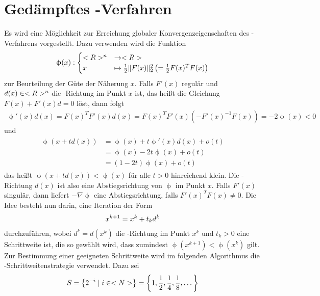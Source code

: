 \section{Gedämpftes -Verfahren}

Es wird eine Möglichkeit zur Erreichung globaler Konvergenzeigenschaften des -Verfahrens vorgestellt. Dazu verwenden wird die Funktion
\begin{align}
	\upphi(x): \begin{cases}
		<R>^n&\to <R> \\
		x&\mapsto \frac{1}{2}\Vert F(x)\Vert_2^2 \left(=\frac{1}{2}F(x)^TF(x)\right)
	\end{cases}\notag
\end{align}
zur Beurteilung der Güte der Näherung $x$. Falls $F'(x)$ regulär und $d(x)\in<R>^n$ die -Richtung im Punkt $x$ ist, das heißt die Gleichung $F(x)+F'(x)d=0$ löst, dann folgt
\begin{align}
	\label{5.6}
	\upphi'(x)d(x) = F(x)^TF'(x)d(x) = F(x)^TF'(x)\left(-F'(x)^{-1}F(x)\right) = -2\upphi(x)< 0
\end{align}
und
\begin{align}
	\label{5.7}
	\begin{split}
		\upphi(x+td(x)) &= \upphi(x) + t\upphi'(x)d(x)+o(t) \\
		&= \upphi(x) - 2t\upphi(x) + o(t) \\
		&= (1-2t)\upphi(x) + o(t)
	\end{split}
\end{align}
das heißt $\upphi(x+td(x))<\upphi(x)$ für alle $t>0$ hinreichend klein. Die -Richtung $d(x)$ ist also eine Abstiegsrichtung von $\upphi$ im Punkt $x$. Falls $F'(x)$ singulär, dann liefert $-\nabla\upphi$ eine Abstiegsrichtung, falls $F'(x)^TF(x)\neq 0$. Die Idee besteht nun darin, eine Iteration der Form
\begin{align}
	x^{k+1} = x^k + t_kd^k\notag
\end{align}
durchzuführen, wobei $d^k=d(x^k)$ die -Richtung im Punkt $x^k$ und $t_k>0$ eine Schrittweite ist, die so gewählt wird, dass zumindest $\upphi(x^{k+1})<\upphi(x^k)$ gilt. Zur Bestimmung einer geeigneten Schrittweite wird im folgenden Algorithmus die -Schrittweitenstrategie verwendet. Dazu sei
\begin{align}
	S = \left\lbrace 2^{-i}\mid i\in<N>\right\rbrace = \left\lbrace 1, \frac{1}{2}, \frac{1}{4}, \frac{1}{8}, \dots\right\rbrace \notag
\end{align}

